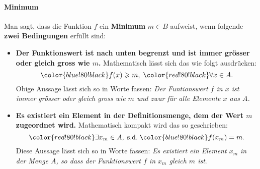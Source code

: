 \documentclass[12pt]{article}
\begin{document}
\paragraph{Minimum}
Man sagt, dass die Funktion $f$ ein \textbf{Minimum} $m \in B$ aufweist, wenn folgende \textbf{zwei Bedingungen} erfüllt sind:
\begin{itemize}
\item \textbf{Der Funktionswert ist nach unten begrenzt und ist immer grösser oder gleich gross wie $m$.} Mathematisch lässt sich das wie folgt ausdrücken: $${\color{blue!80!black}f(x) \geqslant m}, \; {\color{red!80!black}\forall x \in A}.$$
{\footnotesize
Obige Aussage lässt sich so in Worte fassen: \emph{{\color{blue!80!black}Der Funtionswert $f$ in $x$ ist immer grösser oder gleich gross wie $m$} {\color{red!80!black}und zwar für alle Elemente $x$ aus $A$}.}}
\item \textbf{Es existiert ein Element in der Definitionsmenge, dem der Wert $m$ zugeordnet wird.} Mathematisch kompakt wird das so geschrieben: $${\color{red!80!black}\exists x_m \in A}, \; \text{s.d.} \; {\color{blue!80!black}f(x_m) = m}.$$
{\footnotesize Diese Aussage lässt sich so in Worte fassen: \emph{{\color{red!80!black}Es existiert ein Element $x_m$ in der Menge $A$}, so dass {\color{blue!80!black}der Funktionswert $f$ in $x_m$ gleich $m$ ist}}}.
\end{itemize}
\end{document}
